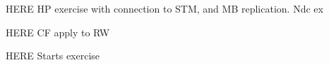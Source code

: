 \documentclass[a4paper]{book}
\def\pf{{\bf Proof. }}
\def\logimplies{\Rightarrow}
\def\convinlaw{\stackrel{{\cal L}}{\Longrightarrow }}
\def\convinp{\stackrel{P}{\longrightarrow }}
\def\convas{\stackrel{a.s.}{\longrightarrow }}
\def\convv{\stackrel{v}{\longrightarrow}}
\def\asymp{\stackrel{{\mathbb P}}{\sim}}
\def\RR{\mathbb R}
\def\ZZ{\mathbb Z}
\def\QQ{\mathbb Q}
\def\NN{\mathbb N}
\def\MM{\mathbb M}
\def\LL{\mathbb L}
\def\EE{\mathbb E}
\def\PP{\mathbb P}
\def\DD{\mathbb D}
\def\WW{\mathbb W}
\def\FF{\mathbb F}
\def\II{\mathbb I}
\def\FF{\mathbb F}
\begin{document}
% 
%  
% 
% 



HERE  HP exercise with connection to STM, and MB replication.  Ndc ex

HERE CF apply to RW

HERE  Starts exercise



\def\pf{{\bf Proof. }}
\def\logimplies{\Rightarrow}
\def\convinlaw{\stackrel{{\cal L}}{\Longrightarrow }}
\def\convinp{\stackrel{P}{\longrightarrow }}
\def\convas{\stackrel{a.s.}{\longrightarrow }}
\def\convv{\stackrel{v}{\longrightarrow}}
\def\asymp{\stackrel{{\mathbb P}}{\sim}}
\def\RR{\mathbb R}
\def\ZZ{\mathbb Z}
\def\QQ{\mathbb Q}
\def\NN{\mathbb N}
\def\MM{\mathbb M}
\def\LL{\mathbb L}
\def\EE{\mathbb E}
\def\PP{\mathbb P}
\def\DD{\mathbb D}
\def\WW{\mathbb W}
\def\FF{\mathbb F}
\def\II{\mathbb I}
\def\FF{\mathbb F}
\def\ttheta{\widetilde{\theta}}
\def\tTheta{\widetilde{\Theta}}
\def\tsig{\widetilde{\sigma}^2}
\def\tc{\widetilde{c}}
\def\etheta{\widehat{\theta}}
\def\eTheta{\widehat{\Theta}}
\def\esig{\widehat{\sigma}^2}
\def\ptheta{\underline{\theta}}
\def\pTheta{\underline{\Theta}}
\def\psig{\underline{\sigma}^2}
\end{document}
